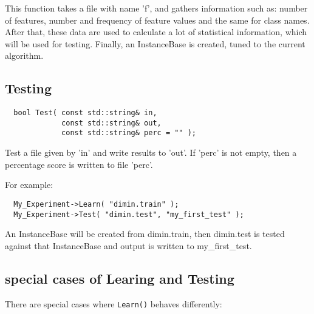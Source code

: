 \documentclass{report}
\begin{document}
This function takes a file with name 'f', and gathers information
such as: number of features, number and frequency of feature values and
the same for class names. After that, these data are used to calculate
a lot of statistical information, which will be used for
testing. Finally, an InstanceBase is created, tuned to the current
algorithm.

\subsection{Testing}
\begin{footnotesize}
\begin{verbatim}
  bool Test( const std::string& in,
             const std::string& out,
             const std::string& perc = "" );
\end{verbatim}
\end{footnotesize}

Test a file given by 'in' and write results to 'out'. If 'perc' is not
empty, then a percentage score is written to file 'perc'.

For example:

\begin{footnotesize}
\begin{verbatim}
  My_Experiment->Learn( "dimin.train" );  
  My_Experiment->Test( "dimin.test", "my_first_test" );  
\end{verbatim}
\end{footnotesize}

An InstanceBase will be created from dimin.train, then dimin.test is
tested against that InstanceBase and output is written to
my\_first\_test.

\subsection{special cases of Learing and Testing}

There are special cases where {\tt Learn()} behaves differently:
\end{document}
